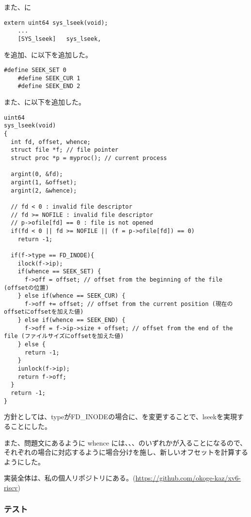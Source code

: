 \documentclass[platex,dvipdfmx, titlepage]{jlreq} %
\begin{document}
\noindent また、に

\begin{lstlisting}[caption={kernel/sysycall.c}]
    extern uint64 sys_lseek(void);
    ...
    [SYS_lseek]   sys_lseek,
\end{lstlisting}
\noindent を追加、に以下を追加した。

\begin{lstlisting}[caption={kernel/fcntl.h}]
    #define SEEK_SET 0
    #define SEEK_CUR 1
    #define SEEK_END 2
\end{lstlisting}

\noindent また、に以下を追加した。

\begin{lstlisting}[caption={kernel/sysfile.c}]
uint64
sys_lseek(void)
{
  int fd, offset, whence;
  struct file *f; // file pointer
  struct proc *p = myproc(); // current process
  
  argint(0, &fd);
  argint(1, &offset);
  argint(2, &whence);
  
  // fd < 0 : invalid file descriptor
  // fd >= NOFILE : invalid file descriptor
  // p->ofile[fd] == 0 : file is not opened 
  if(fd < 0 || fd >= NOFILE || (f = p->ofile[fd]) == 0)
    return -1;

  if(f->type == FD_INODE){
    ilock(f->ip);
    if(whence == SEEK_SET) {
      f->off = offset; // offset from the beginning of the file (offsetの位置)
    } else if(whence == SEEK_CUR) {
      f->off += offset; // offset from the current position (現在のoffsetにoffsetを加えた値)
    } else if(whence == SEEK_END) {
      f->off = f->ip->size + offset; // offset from the end of the file (ファイルサイズにoffsetを加えた値)
    } else {
      return -1;
    }
    iunlock(f->ip);
    return f->off;
  }
  return -1;
}
\end{lstlisting}

方針としては、typeがFD\_INODEの場合に、を変更することで、lseekを実現することにした。

また、問題文にあるように whence には、、、のいずれかが入ることになるので、それぞれの場合に対応するように場合分けを施し、新しいオフセットを計算するようにした。

実装全体は、私の個人リポジトリにある。(\url{https://github.com/okoge-kaz/xv6-riscv})

\subsubsection*{テスト}
\end{document}
